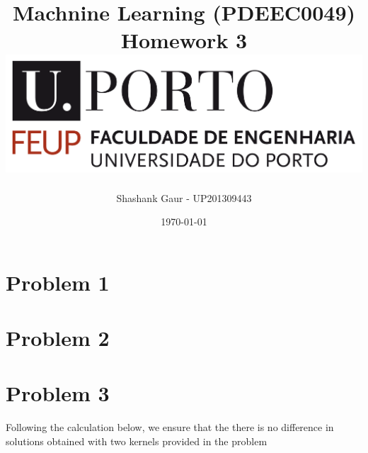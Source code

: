 \documentclass[11pt]{article}
\begin{document}

\title{
	\vspace{-30mm}
	{\LARGE Machnine Learning (PDEEC0049)\\ \Large Homework 3 }\\[80mm]
    {\includegraphics[scale=0.1]{feup-logo}}\\[50mm]
}
\author{Shashank Gaur - UP201309443\\}
\date{\today}
\maketitle
\newpage
\section{Problem 1}

\section{Problem 2}

\section{Problem 3}
Following the calculation below, we ensure that the there is no difference in solutions obtained with two kernels provided in the problem
\end{document}
